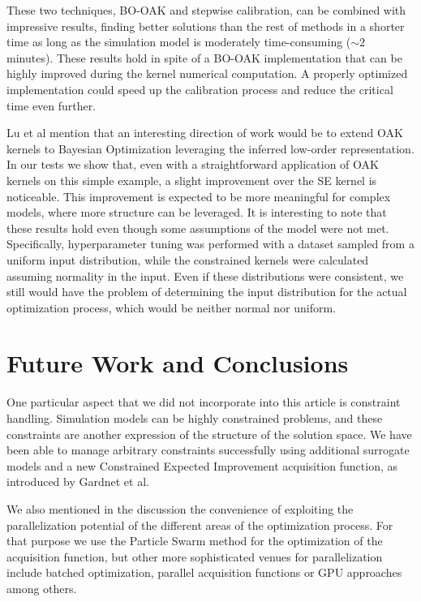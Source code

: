 \documentclass{IOS-Book-Article}
\begin{document}
	These two techniques, BO-OAK and stepwise calibration, can be combined with impressive results, finding better solutions than the rest of methods in a shorter time as long as the simulation model is moderately time-consuming ($\sim 2$ minutes). These results hold in spite of a BO-OAK implementation that can be highly improved during the kernel numerical computation. A properly optimized implementation could speed up the calibration process and reduce the critical time even further.
		
	Lu et al\cite{gp-additive-orthogonal} mention that an interesting direction of work would be to extend OAK kernels to Bayesian Optimization leveraging the inferred low-order representation. In our tests we show that, even with a straightforward application of OAK kernels on this simple example, a slight improvement over the SE kernel is noticeable. This improvement is expected to be more meaningful for complex models, where more structure can be leveraged. It is interesting to note that these results hold even though some assumptions of the model were not met. Specifically, hyperparameter tuning was performed with a dataset sampled from a uniform input distribution, while the constrained kernels were calculated assuming normality in the input. Even if these distributions were consistent, we still would have the problem of determining the input distribution for the actual optimization process, which would be neither normal nor uniform.
	
	
	\section{Future Work and Conclusions}
	One particular aspect that we did not incorporate into this article is constraint handling. Simulation models can be highly constrained problems, and these constraints are another expression of the structure of the solution space. We have been able to manage arbitrary constraints successfully using additional surrogate models and a new Constrained Expected Improvement acquisition function, as introduced by Gardnet et al\cite{gp-constraints}.
	
	We also mentioned in the discussion the convenience of exploiting the parallelization potential of the different areas of the optimization process. For that purpose we use the Particle Swarm method for the optimization of the acquisition function, but other more sophisticated venues for parallelization include batched optimization\cite{gp-batch}, parallel acquisition functions\cite{gp-parallel-acq-func} or GPU approaches\cite{gp-gpu} among others.
	
\end{document}
